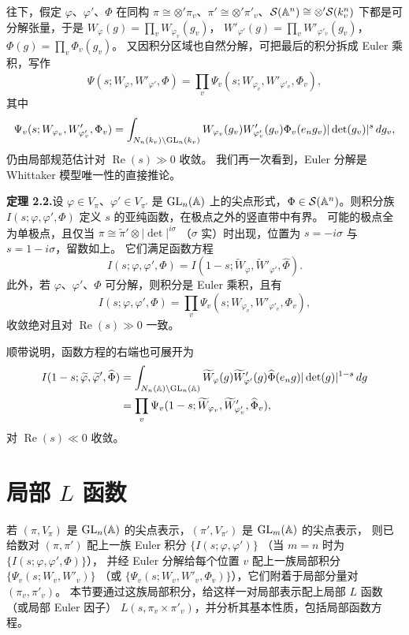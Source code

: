 往下，假定 $\varphi$、$\varphi'$、$\Phi$ 在同构
$\pi\cong\otimes'\pi_v$、$\pi'\cong\otimes'\pi'_v$、$\mathcal{S}(\mathbb{A}^n)\cong\otimes'\mathcal{S}(k_v^n)$
下都是可分解张量，于是
$W_\varphi(g)=\prod_vW_{\varphi_v}(g_v)$，
$W'_{\varphi'}(g)=\prod_vW'_{\varphi'_v}(g_v)$，
$\Phi(g)=\prod_v\Phi_v(g_v)$。
又因积分区域也自然分解，可把最后的积分拆成 Euler 乘积，写作
\[
\Psi(s;W_\varphi,W'_{\varphi'},\Phi)
=\prod_v\Psi_v(s;W_{\varphi_v},W'_{\varphi'_v},\Phi_v),
\]
其中
\[
\Psi_v(s;W_{\varphi_v},W'_{\varphi'_v},\Phi_v)
=\int_{N_n(k_v)\backslash\mathrm{GL}_n(k_v)}
W_{\varphi_v}(g_v)W'_{\varphi'_v}(g_v)\Phi_v(e_ng_v)|\det(g_v)|^s\,dg_v,
\]
仍由局部规范估计对 $\operatorname{Re}(s)\gg0$ 收敛。
我们再一次看到，Euler 分解是 Whittaker 模型唯一性的直接推论。

\textbf{定理 2.2.}\quad 设 $\varphi\in V_\pi$、$\varphi'\in V_{\pi'}$ 是 $\mathrm{GL}_n(\mathbb{A})$
上的尖点形式，$\Phi\in\mathcal{S}(\mathbb{A}^n)$。则积分族 $I(s;\varphi,\varphi',\Phi)$
定义 $s$ 的亚纯函数，在极点之外的竖直带中有界。
可能的极点全为单极点，且仅当 $\pi\cong\widetilde{\pi}'\otimes|\det|^{i\sigma}$
（$\sigma$ 实）时出现，位置为 $s=-i\sigma$ 与 $s=1-i\sigma$，留数如上。
它们满足函数方程
\[
I(s;\varphi,\varphi',\Phi)=I(1-s;\widetilde{W}_\varphi,\widetilde{W}'_{\varphi'},\widehat{\Phi}).
\]
此外，若 $\varphi$、$\varphi'$、$\Phi$ 可分解，则积分是 Euler 乘积，且有
\[
I(s;\varphi,\varphi',\Phi)=\prod_v\Psi_v(s;W_{\varphi_v},W'_{\varphi'_v},\Phi_v),
\]
收敛绝对且对 $\operatorname{Re}(s)\gg0$ 一致。

顺带说明，函数方程的右端也可展开为
\[
\begin{aligned}
I(1-s;\widetilde{\varphi},\widetilde{\varphi}',\widehat{\Phi})
&=\int_{N_n(\mathbb{A})\backslash\mathrm{GL}_n(\mathbb{A})}
\widetilde{W}_\varphi(g)\widetilde{W}'_{\varphi'}(g)\widehat{\Phi}(e_ng)|\det(g)|^{1-s}\,dg\\
&=\prod_v\Psi_v(1-s;\widetilde{W}_{\varphi_v},\widetilde{W}'_{\varphi'_v},\widehat{\Phi}_v),
\end{aligned}
\]
对 $\operatorname{Re}(s)\ll0$ 收敛。
\section{局部 \texorpdfstring{$L$}{L} 函数}

若 $(\pi,V_\pi)$ 是 $\mathrm{GL}_n(\mathbb{A})$ 的尖点表示，$(\pi',V_{\pi'})$ 是 $\mathrm{GL}_m(\mathbb{A})$ 的尖点表示，
则已给数对 $(\pi,\pi')$ 配上一族 Euler 积分 $\{I(s;\varphi,\varphi')\}$
（当 $m=n$ 时为 $\{I(s;\varphi,\varphi',\Phi)\}$），
并经 Euler 分解给每个位置 $v$ 配上一族局部积分 $\{\Psi_v(s;W_v,W'_v)\}$
（或 $\{\Psi_v(s;W_v,W'_v,\Phi_v)\}$），它们附着于局部分量对 $(\pi_v,\pi'_v)$。
本节要通过这族局部积分，给这样一对局部表示配上局部 $L$ 函数（或局部 Euler 因子）
$L(s,\pi_v\times\pi'_v)$，并分析其基本性质，包括局部函数方程。

